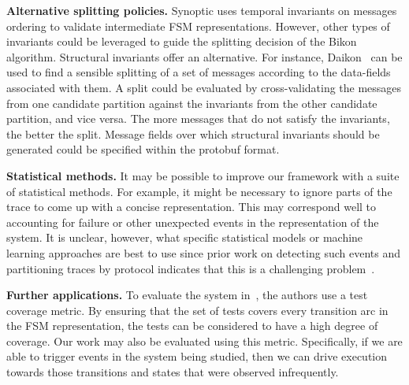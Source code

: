
\textbf{Alternative splitting policies.} Synoptic uses temporal
invariants on messages ordering to validate intermediate FSM
representations. However, other types of invariants could be leveraged
to guide the splitting decision of the Bikon algorithm. Structural
invariants offer an alternative. For instance, Daikon~\cite{Daikon}
can be used to find a sensible splitting of a set of messages
according to the data-fields associated with them. A split could be
evaluated by cross-validating the messages from one candidate
partition against the invariants from the other candidate partition,
and vice versa. The more messages that do not satisfy the invariants,
the better the split. Message fields over which structural invariants
should be generated could be specified within the protobuf format.

\textbf{Statistical methods.} It may be possible to improve our
framework with a suite of statistical methods. For example, it might
be necessary to ignore parts of the trace to come up with a concise
representation. This may correspond well to accounting for failure or
other unexpected events in the representation of the system. It is
unclear, however, what specific statistical models or machine learning
approaches are best to use since prior work on detecting such events
and partitioning traces by protocol indicates that this is a
challenging problem~\cite{Constellation}.



\textbf{Further applications.} To evaluate the system in~\cite{AGSBM},
the authors use a test coverage metric. By ensuring that the set of
tests covers every transition arc in the FSM representation, the tests
can be considered to have a high degree of coverage. Our work may also
be evaluated using this metric. Specifically, if we are able to
trigger events in the system being studied, then we can drive
execution towards those transitions and states that were observed
infrequently.




